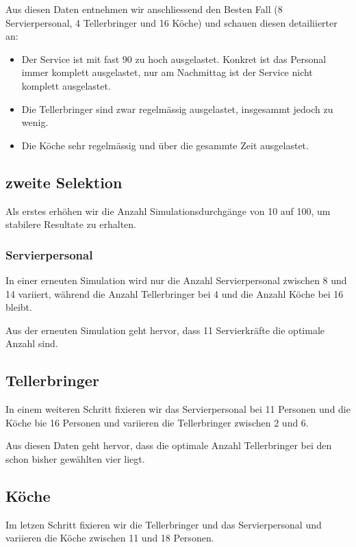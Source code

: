 \documentclass[ngerman,a4paper,12pt]{scrreprt}
\begin{document}
			Aus diesen Daten entnehmen wir anschliessend den Besten Fall (8 Servierpersonal, 4 Tellerbringer und 16 Köche) und schauen diesen detailiierter an:
		
			\begin{itemize}
				\item Der Service ist mit fast 90 zu hoch ausgelastet. Konkret ist das Personal immer komplett ausgelastet, nur am Nachmittag ist der Service nicht komplett ausgelastet.
				\item Die Tellerbringer sind zwar regelmässig ausgelastet, insgesammt jedoch zu wenig.
				\item Die Köche sehr regelmässig und über die gesammte Zeit ausgelastet.
			\end{itemize}
			
			
		\subsection{zweite Selektion}
			Als erstes erhöhen wir die Anzahl Simulationsdurchgänge von 10 auf 100, um stabilere Resultate zu erhalten.
			
			\subsubsection{Servierpersonal}
				In einer erneuten Simulation wird nur die Anzahl Servierpersonal zwischen 8 und 14 variiert, während die Anzahl Tellerbringer bei 4 und die Anzahl Köche bei 16 bleibt.
				
				Aus der erneuten Simulation geht hervor, dass 11 Servierkräfte die optimale Anzahl sind.
				
			\subsection{Tellerbringer}
				In einem weiteren Schritt fixieren wir das Servierpersonal bei 11 Personen und die Köche bie 16 Personen und variieren die Tellerbringer zwischen 2 und 6.
				
				Aus diesen Daten geht hervor, dass die optimale Anzahl Tellerbringer bei den schon bisher gewählten vier liegt.

			\subsection{Köche}
				Im letzen Schritt fixieren wir die Tellerbringer und das Servierpersonal und variieren die Köche zwischen 11 und 18 Personen.
				
\end{document}
